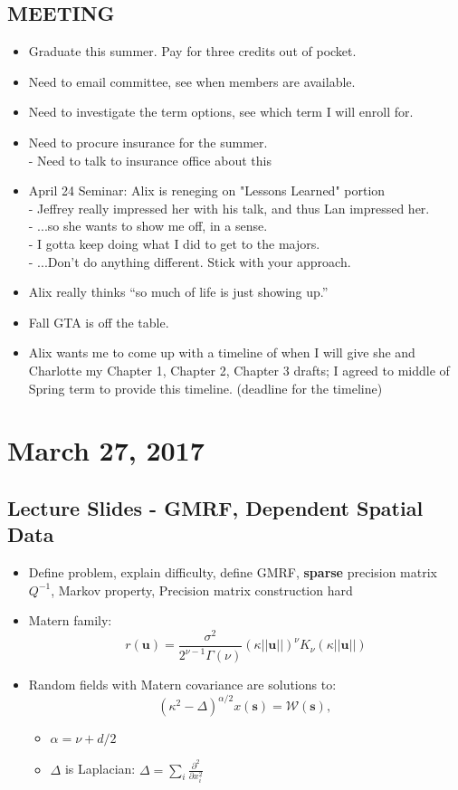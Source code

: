 \documentclass{article}
\begin{document}
\subsection*{MEETING}
\begin{itemize}
\item Graduate this summer. Pay for three credits out of pocket.
\item Need to email committee, see when members are available.
\item Need to investigate the term options, see which term I will enroll for.
\item Need to procure insurance for the summer. \\
     - Need to talk to insurance office about this
\item April 24 Seminar: Alix is reneging on "Lessons Learned" portion \\
     - Jeffrey really impressed her with his talk, and thus Lan impressed her.  \\
     - ...so she wants to show me off, in a sense. \\
     - I gotta keep doing what I did to get to the majors. \\
     - ...Don't do anything different. Stick with your approach. \\
\item Alix really thinks ``so much of life is just showing up.''
\item Fall GTA is off the table.
\item Alix wants me to come up with a timeline of when I will give she and Charlotte my Chapter 1, Chapter 2, Chapter 3 drafts; I agreed to middle of Spring term to provide this timeline. (deadline for the timeline)
\end{itemize}

\section*{March 27, 2017}

\subsection*{Lecture Slides - GMRF, Dependent Spatial Data}
\citep{Lindstrom2011}
\begin{itemize}
\item Define problem, explain difficulty, define GMRF, {\bf sparse} precision matrix $Q^{-1}$, Markov property, Precision matrix construction hard
\item  Matern family:
 $$r(\pmb{u}) = \frac{\sigma^{2}}{2^{\nu - 1}\Gamma(\nu)}(\kappa||\pmb{u}||)^{\nu}K_{\nu}(\kappa||\pmb{u}||)$$
\item Random fields with Matern covariance are solutions to:
$$ (\kappa^{2} - \Delta)^{\alpha/2}x(\pmb{s}) = \mathcal{W}(\pmb{s})\text{, } $$
      \begin{itemize}
      \item $\alpha = \nu + d/2$
      \item $\Delta$ is Laplacian: $ \Delta = \sum_{i} \frac{\partial^{2}}{\partial x_{i}^{2}} $
      \end{itemize}
\end{itemize}
\end{document}
